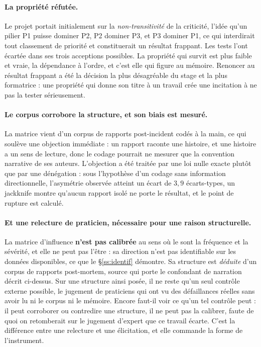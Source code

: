 \documentclass[12pt,a4paper]{article}
\theoremstyle{definition}
\begin{document}
\paragraph{La propriété réfutée.} Le projet portait initialement sur la
\emph{non-transitivité} de la criticité, l'idée qu'un pilier P1 puisse dominer P2,
P2 dominer P3, et P3 dominer P1, ce qui interdirait tout classement de priorité et
constituerait un résultat frappant. Les tests l'ont écartée dans ses trois
acceptions possibles. La propriété qui survit est plus faible et vraie, la
dépendance à l'ordre, et c'est elle qui figure au mémoire. Renoncer au résultat
frappant a été la décision la plus désagréable du stage et la plus formatrice :
une propriété qui donne son titre à un travail crée une incitation à ne pas la
tester sérieusement.

\paragraph{Le corpus corrobore la structure, et son biais est mesuré.} La matrice
vient d'un corpus de rapports post-incident codés à la main, ce qui soulève une
objection immédiate : un rapport raconte une histoire, et une histoire a un sens
de lecture, donc le codage pourrait ne mesurer que la convention narrative de ses
auteurs. L'objection a été traitée par une loi nulle exacte plutôt que par une
dénégation : sous l'hypothèse d'un codage sans information directionnelle,
l'asymétrie observée atteint un écart de $3{,}9$ écarts-types, un jackknife montre
qu'aucun rapport isolé ne porte le résultat, et le point de rupture est calculé.

\paragraph{Et une relecture de praticien, nécessaire pour une raison structurelle.}
La matrice d'influence \textbf{n'est pas calibrée} au sens où le sont la fréquence
et la sévérité, et elle ne peut pas l'être : sa direction n'est pas identifiable
sur les données disponibles, ce que le \S\ref{ss:identif} démontre. Sa structure est
\emph{déduite} d'un corpus de rapports post-mortem, source qui porte le confondant
de narration décrit ci-dessus. Sur une structure ainsi posée, il ne reste qu'un
seul contrôle externe possible, le jugement de praticiens qui ont vu des
défaillances réelles sans avoir lu ni le corpus ni le mémoire. Encore faut-il voir
ce qu'un tel contrôle peut : il peut corroborer ou contredire une structure, il ne
peut pas la calibrer, faute de quoi on retomberait sur le jugement d'expert que ce
travail écarte. C'est la différence entre une relecture et une élicitation, et elle
commande la forme de l'instrument.
\end{document}
